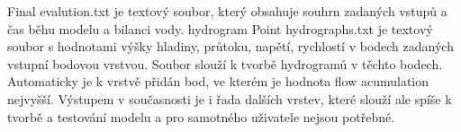 {Final evalution.txt je textový soubor, který obsahuje souhrn zadaných vstupů a čas běhu modelu a bilanci vody. 
hydrogram
Point hydrographs.txt je textový soubor s hodnotami výšky hladiny, průtoku, napětí, rychlostí v bodech zadaných vstupní bodovou vrstvou. Soubor slouží k tvorbě hydrogramů v těchto bodech. Automaticky je k vrstvě přidán bod, ve kterém je hodnota flow acumulation nejvyšší.
Výstupem v současnosti je i řada dalších vrstev, které slouží ale spíše k tvorbě a testování modelu a pro samotného uživatele nejsou potřebné.	

}



